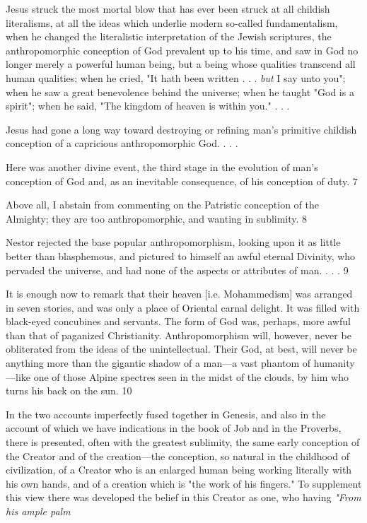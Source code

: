 Jesus struck the most mortal blow that has ever been struck at all childish literalisms, at all
the ideas which underlie modern so-called fundamentalism, when he changed the literalistic
interpretation of the Jewish scriptures, the anthropomorphic conception of God prevalent up
to his time, and saw in God no longer merely a powerful human being, but a being whose
qualities transcend all human qualities; when he cried, "It hath been written . . . \textit{but} I say unto
you"; when he saw a great benevolence behind the universe; when he taught "God is a spirit";
when he said, "The kingdom of heaven is within you." . . .

Jesus had gone a long way toward destroying or refining man's primitive childish conception
of a capricious anthropomorphic God. . . .

Here was another divine event, the third stage in the evolution of man's conception of God
and, as an inevitable consequence, of his conception of duty. 7

Above all, I abstain from commenting on the Patristic conception of the Almighty; they are
too anthropomorphic, and wanting in sublimity. 8

Nestor rejected the base popular anthropomorphism, looking upon it as little better than
blasphemous, and pictured to himself an awful eternal Divinity, who pervaded the universe,
and had none of the aspects or attributes of man. . . . 9

It is enough now to remark that their heaven [i.e. Mohammedism] was arranged in seven
stories, and was only a place of Oriental carnal delight. It was filled with black-eyed
concubines and servants. The form of God was, perhaps, more awful than that of paganized
Christianity. Anthropomorphism will, however, never be obliterated from the ideas of the
unintellectual. Their God, at best, will never be anything more than the gigantic shadow of a
man—a vast phantom of humanity—like one of those Alpine spectres seen in the midst of
the clouds, by him who turns his back on the sun. 10

In the two accounts imperfectly fused together in Genesis, and also in the account of which
we have indications in the book of Job and in the Proverbs, there is presented, often with the
greatest sublimity, the same early conception of the Creator and of the creation—the
conception, so natural in the childhood of civilization, of a Creator who is an enlarged human
being working literally with his own hands, and of a creation which is "the work of his
fingers." To supplement this view there was developed the belief in this Creator as one, who
having \textit{"From his ample palm}

